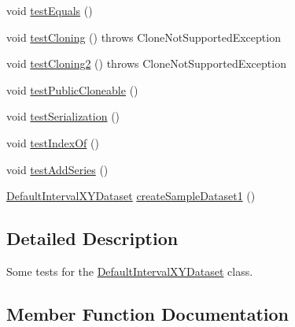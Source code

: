\begin{DoxyCompactItemize}
\item 
void \mbox{\hyperlink{classorg_1_1jfree_1_1data_1_1xy_1_1_default_interval_x_y_dataset_test_a236bf4651cdf7a1dd13236ef0e414b89}{test\+Equals}} ()
\item 
void \mbox{\hyperlink{classorg_1_1jfree_1_1data_1_1xy_1_1_default_interval_x_y_dataset_test_a1fcd4f368a439e2dc87f842de670acf7}{test\+Cloning}} ()  throws Clone\+Not\+Supported\+Exception 
\item 
void \mbox{\hyperlink{classorg_1_1jfree_1_1data_1_1xy_1_1_default_interval_x_y_dataset_test_aec0e298c1dfd7e8a5e2ff2ccacc791b4}{test\+Cloning2}} ()  throws Clone\+Not\+Supported\+Exception 
\item 
void \mbox{\hyperlink{classorg_1_1jfree_1_1data_1_1xy_1_1_default_interval_x_y_dataset_test_ac87ef0b4f192141b5ee7e655d6fd579b}{test\+Public\+Cloneable}} ()
\item 
void \mbox{\hyperlink{classorg_1_1jfree_1_1data_1_1xy_1_1_default_interval_x_y_dataset_test_a3c418890b3f461309d5133f1067e8407}{test\+Serialization}} ()
\item 
void \mbox{\hyperlink{classorg_1_1jfree_1_1data_1_1xy_1_1_default_interval_x_y_dataset_test_a139b628a94dd066476318bb5d96168a5}{test\+Index\+Of}} ()
\item 
void \mbox{\hyperlink{classorg_1_1jfree_1_1data_1_1xy_1_1_default_interval_x_y_dataset_test_ace76f11258b3c19d2b7ba10796c13774}{test\+Add\+Series}} ()
\item 
\mbox{\hyperlink{classorg_1_1jfree_1_1data_1_1xy_1_1_default_interval_x_y_dataset}{Default\+Interval\+X\+Y\+Dataset}} \mbox{\hyperlink{classorg_1_1jfree_1_1data_1_1xy_1_1_default_interval_x_y_dataset_test_a2686238e344e95686966d7143e4546c2}{create\+Sample\+Dataset1}} ()
\end{DoxyCompactItemize}


\subsection{Detailed Description}
Some tests for the \mbox{\hyperlink{classorg_1_1jfree_1_1data_1_1xy_1_1_default_interval_x_y_dataset}{Default\+Interval\+X\+Y\+Dataset}} class. 

\subsection{Member Function Documentation}
\mbox{\label{classorg_1_1jfree_1_1data_1_1xy_1_1_default_interval_x_y_dataset_test_a2686238e344e95686966d7143e4546c2}} 
